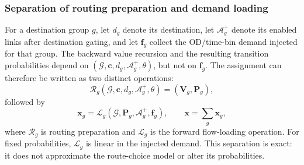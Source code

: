 \subsubsection{Separation of routing preparation and demand loading}

For a destination group $g$, let $d_g$ denote its destination, let
$\mathcal A_g^+$ denote its enabled links after destination gating, and let
$\bm f_g$ collect the OD/time-bin demand injected for that group. The backward
value recursion and the resulting transition probabilities depend on
$(\mathcal G,\bm c,d_g,\mathcal A_g^+,\theta)$, but not on $\bm f_g$. The
assignment can therefore be written as two distinct operations:
\[
\mathcal R_g(\mathcal G,\bm c,d_g,\mathcal A_g^+,\theta)
= (\bm V_g,\bm P_g),
\]
followed by
\[
\bm x_g
=\mathcal L_g(\mathcal G,\bm P_g,\mathcal A_g^+,\bm f_g),
\qquad
\bm x=\sum_g \bm x_g,
\]
where $\mathcal R_g$ is routing preparation and $\mathcal L_g$ is the forward
flow-loading operation. For fixed probabilities, $\mathcal L_g$ is linear in
the injected demand. This separation is exact: it does not approximate the
route-choice model or alter its probabilities.


